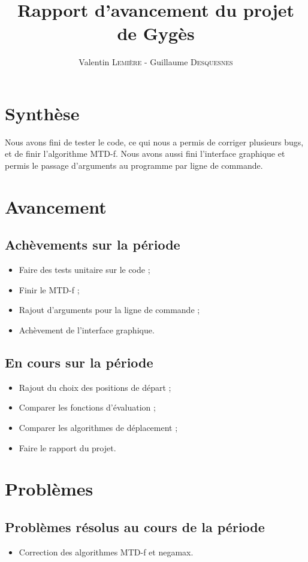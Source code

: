 \documentclass[a4paper]{article}
\title{Rapport d'avancement \no 5 du projet de Gygès}
\author{Valentin \textsc{Lemière} - Guillaume \textsc{Desquesnes}}
\date{}
\begin{document}
\maketitle

\section*{Synthèse}
	Nous avons fini de tester le code, ce qui nous a permis de corriger
	plusieurs bugs, et de finir l'algorithme MTD-f. Nous avons aussi
	fini l'interface graphique et permis le passage d'arguments au programme
	par ligne de commande.

\section*{Avancement}
	\subsection*{Achèvements sur la période}
		\begin{itemize}
			\item Faire des tests unitaire sur le code ;
			\item Finir le MTD-f ;
			\item Rajout d'arguments pour la ligne de commande ;
			\item Achèvement de l'interface graphique.
		\end{itemize}

	\subsection*{En cours sur la période}
		\begin{itemize}
			\item Rajout du choix des positions de départ ;
			\item Comparer les fonctions d'évaluation ;
			\item Comparer les algorithmes de déplacement ;
			\item Faire le rapport du projet.
		\end{itemize}

\section*{Problèmes}
	\subsection*{Problèmes résolus au cours de la période}
		\begin{itemize}
			\item Correction des algorithmes MTD-f et negamax.
		\end{itemize}
\end{document}

